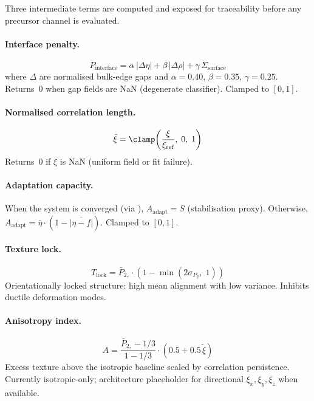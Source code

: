 \documentclass[11pt]{article}
\begin{document}
Three intermediate terms are computed and exposed for traceability before
any precursor channel is evaluated.

\paragraph{Interface penalty.}
\begin{equation}
  P_\text{interface}
    = \alpha\,|\Delta\eta| + \beta\,|\Delta\rho|
    + \gamma\,\Sigma_\text{surface}
  \label{eq:interface_penalty}
\end{equation}
where $\Delta$ are normalised bulk-edge gaps and
$\alpha{=}0.40$, $\beta{=}0.35$, $\gamma{=}0.25$.
Returns~0 when gap fields are NaN (degenerate classifier).
Clamped to $[0,1]$.

\paragraph{Normalised correlation length.}
\begin{equation}
  \tilde\xi = \clamp\!\left(\frac{\xi}{\xi_\text{ref}},\; 0,\; 1\right)
\end{equation}
Returns~0 if $\xi$ is NaN (uniform field or fit failure).

\paragraph{Adaptation capacity.}
When the system is converged (via ),
$A_\text{adapt} = S$ (stabilisation proxy).
Otherwise, $A_\text{adapt} = \bar\eta \cdot (1 - \overline{|\eta-f|})$.
Clamped to $[0,1]$.

\paragraph{Texture lock.}
\begin{equation}
  T_\text{lock} = \bar{P}_{2,\hat{}} \cdot (1 - \min(2\sigma_{P_2},\; 1))
\end{equation}
Orientationally locked structure: high mean alignment with low variance.
Inhibits ductile deformation modes.

\paragraph{Anisotropy index.}
\begin{equation}
  A = \frac{\bar{P}_{2,\hat{}} - 1/3}{1 - 1/3}
      \cdot (0.5 + 0.5\,\tilde\xi)
\end{equation}
Excess texture above the isotropic baseline scaled by correlation
persistence.  Currently isotropic-only; architecture placeholder for
directional $\xi_x, \xi_y, \xi_z$ when available.
\end{document}
